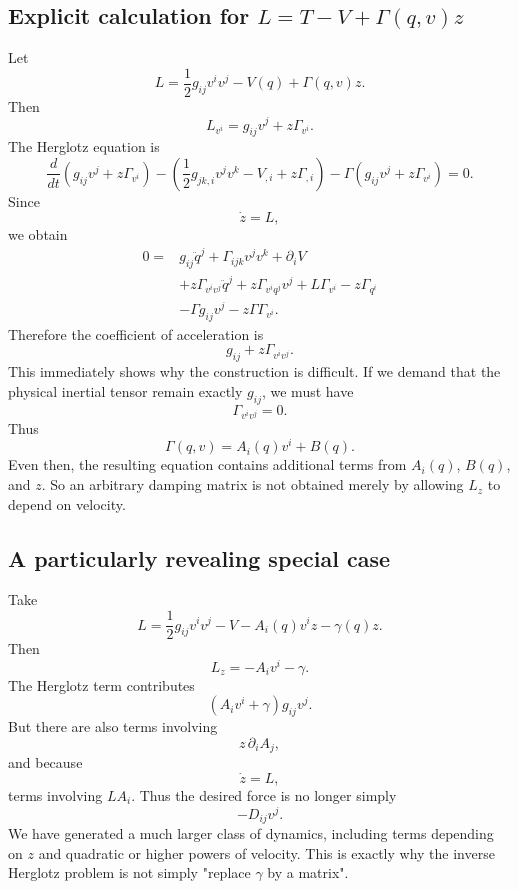 \subsection{Explicit calculation for \(L=T-V+\Gamma(q,v)z\)}

Let
\begin{equation}
 L = \frac12g_{ij}v^iv^j - V(q) + \Gamma(q,v)z. \tag{27} 
\end{equation}
Then
\begin{equation}
 L_{v^i} = g_{ij}v^j+z\Gamma_{v^i}. \tag{28} 
\end{equation}
The Herglotz equation is
\begin{equation}
 \frac d{dt} \left(g_{ij}v^j+z\Gamma_{v^i}\right) - \left( \frac12g_{jk,i}v^jv^k-V_{,i} +z\Gamma_{,i} \right) - \Gamma \left(g_{ij}v^j+z\Gamma_{v^i}\right) =0. \tag{29} 
\end{equation}
Since
$$ \dot z=L, $$
we obtain
\begin{equation}
 \begin{aligned} 0={}& g_{ij}\ddot q^j +\Gamma_{ijk}v^jv^k +\partial_iV \\ &+ z\Gamma_{v^iv^j}\ddot q^j + z\Gamma_{v^iq^j}v^j + L\Gamma_{v^i} - z\Gamma_{q^i} \\ &- \Gamma g_{ij}v^j - z\Gamma\Gamma_{v^i}. \end{aligned} \tag{30} 
\end{equation}
Therefore the coefficient of acceleration is
\begin{equation}
 \boxed{ g_{ij}+z\Gamma_{v^iv^j}. } \tag{31} 
\end{equation}
This immediately shows why the construction is difficult.
If we demand that the physical inertial tensor remain exactly \(g_{ij}\), we must have
\begin{equation}
 \boxed{ \Gamma_{v^iv^j}=0. } \tag{32} 
\end{equation}
Thus
\begin{equation}
 \Gamma(q,v) = A_i(q)v^i+B(q). \tag{33} 
\end{equation}
Even then, the resulting equation contains additional terms from \(A_i(q)\), \(B(q)\), and \(z\).
So an arbitrary damping matrix is not obtained merely by allowing \(L_z\) to depend on velocity.

\subsection{A particularly revealing special case}

Take
\begin{equation}
 L= \frac12g_{ij}v^iv^j - V - A_i(q)v^i z - \gamma(q)z. \tag{34} 
\end{equation}
Then
$$ L_z=-A_iv^i-\gamma. $$
The Herglotz term contributes
$$ (A_iv^i+\gamma)g_{ij}v^j. $$
But there are also terms involving
$$ z\,\partial_iA_j, $$
and because
$$ \dot z=L, $$
terms involving \(L A_i\).
Thus the desired force is no longer simply
$$ -D_{ij}v^j. $$
We have generated a much larger class of dynamics, including terms depending on \(z\) and quadratic or higher powers of velocity.
This is exactly why the inverse Herglotz problem is not simply "replace \(\gamma\) by a matrix".

